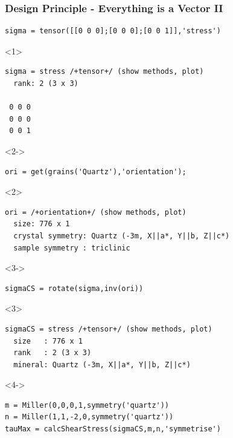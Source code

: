 \documentclass[comptress]{beamer}
\begin{document}
\begin{frame}[fragile]
  \frametitle{Design Principle - Everything is a Vector II }

  \begin{overlayarea}{\textwidth}{\textheight}
\begin{lstlisting}[style=input]
sigma = tensor([[0 0 0];[0 0 0];[0 0 1]],'stress')
\end{lstlisting}
    \begin{onlyenv}<1>
\begin{lstlisting}[style=output]
sigma = stress /+tensor+/ (show methods, plot)
  rank: 2 (3 x 3)

 0 0 0
 0 0 0
 0 0 1
\end{lstlisting}
    \end{onlyenv}
    \begin{onlyenv}<2->
      \vspace{-0.3cm}
\begin{lstlisting}[style=input]
ori = get(grains('Quartz'),'orientation');
\end{lstlisting}
    \end{onlyenv}
    \begin{onlyenv}<2>
\begin{lstlisting}[style=output]
ori = /+orientation+/ (show methods, plot)
  size: 776 x 1
  crystal symmetry: Quartz (-3m, X||a*, Y||b, Z||c*)
  sample symmetry : triclinic
\end{lstlisting}
    \end{onlyenv}
    \vspace{-0.3cm}
    \begin{onlyenv}<3->
\begin{lstlisting}[style=input]
sigmaCS = rotate(sigma,inv(ori))
\end{lstlisting}
    \end{onlyenv}
    \begin{onlyenv}<3>
\begin{lstlisting}[style=output]
sigmaCS = stress /+tensor+/ (show methods, plot)
  size   : 776 x 1
  rank   : 2 (3 x 3)
  mineral: Quartz (-3m, X||a*, Y||b, Z||c*)
\end{lstlisting}
    \end{onlyenv}
    \begin{onlyenv}<4->
      \vspace{-0.3cm}
    \begin{lstlisting}[style=input]
m = Miller(0,0,0,1,symmetry('quartz'))
n = Miller(1,1,-2,0,symmetry('quartz'))
tauMax = calcShearStress(sigmaCS,m,n,'symmetrise')
\end{lstlisting}
    \end{onlyenv}



\end{overlayarea}
\end{frame}
\end{document}
